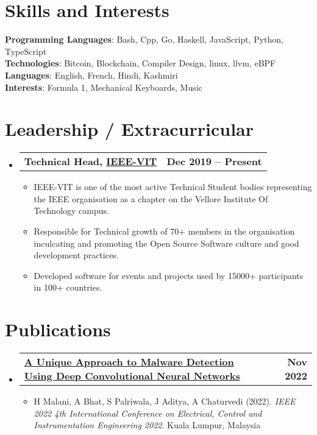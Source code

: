 \documentclass[a4paper,11pt]{article}
\makeatletter
\newcommand{\resumeItem}[1]{
  \item\small{
    {#1 \vspace{-2pt}}
  }
}
\newcommand{\resumeSubheadingg}[2]{
  \vspace{-2pt}\item
    \begin{tabular*}{1.0\textwidth}[t]{l@{\extracolsep{\fill}}r}
      \textbf{#1} & \textbf{\small #2} \\
    \end{tabular*}\vspace{-7pt}
}
\newcommand{\resumeSubHeadingListStart}{\begin{itemize}[leftmargin=0.0in, label={}]}
\newcommand{\resumeSubHeadingListEnd}{\end{itemize}}
\newcommand{\resumeItemListStart}{\begin{itemize}}
\newcommand{\resumeItemListEnd}{\end{itemize}\vspace{-5pt}}
\makeatother
\begin{document}
%
\section{Skills and Interests}
 \begin{itemize}[leftmargin=0.15in, label={}]
    \small{\item{
     \textbf{Programming Languages}{: Bash, Cpp, Go, Haskell, JavaScript, Python, TypeScript} \\
     \textbf{Technologies}{:  Bitcoin, Blockchain, Compiler Design, linux, llvm, eBPF} \\
     \textbf{Languages}{: English, French, Hindi, Kashmiri} \\
     \textbf{Interests}{: Formula 1, Mechanical Keyboards, Music} \\
    }}
 \end{itemize}
 \vspace{-16pt}

\section{Leadership / Extracurricular}
    \resumeSubHeadingListStart
        \resumeSubheadingg{{Technical Head, \href{https://ieeevit.org}{IEEE-VIT}}}{Dec 2019 -- Present}
            \resumeItemListStart
                \resumeItem{IEEE-VIT is one of the most active Technical Student bodies representing the IEEE organisation as a chapter on the Vellore Institute Of Technology campus.}
                \resumeItem{Responsible for Technical growth of 70+ members in the organisation inculcating and promoting the Open Source Software culture and good development practices.}
                \resumeItem{Developed software for events and projects used by 15000+ participants in 100+ countries.}
            \resumeItemListEnd
    \resumeSubHeadingListEnd
    
\section{Publications}
  \resumeSubHeadingListStart
    \resumeSubheadingg
      {\href{https://files.sloorush.com/papers/A_Unique_Approach_to_Malware_Detection_Using_Deep_Convolutional_Neural_Networks.pdf}{A Unique Approach to Malware Detection Using Deep Convolutional Neural Networks}}{Nov 2022}
      \resumeItemListStart
        \resumeItem{H Malani, A Bhat, S Palriwala, J Aditya, A Chaturvedi (2022). \textit{IEEE 2022 4th International Conference on Electrical, Control and Instrumentation Engineering 2022}. Kuala Lumpur, Malaysia}
    \resumeItemListEnd
  \resumeSubHeadingListEnd
\end{document}
